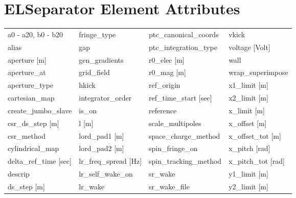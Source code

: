  \section{ELSeparator Element Attributes}
 \label{s:list.elseparator}
 
 \begin{tabular}{llll} \toprule
a0 - a20, b0 - b20               & fringe_type                      & ptc_canonical_coords             & vkick                            \\
alias                            & gap                              & ptc_integration_type             & voltage [Volt]                   \\
aperture [m]                     & gen_gradients                    & r0_elec [m]                      & wall                             \\
aperture_at                      & grid_field                       & r0_mag [m]                       & wrap_superimpose                 \\
aperture_type                    & hkick                            & ref_origin                       & x1_limit [m]                     \\
cartesian_map                    & integrator_order                 & ref_time_start [sec]             & x2_limit [m]                     \\
create_jumbo_slave               & is_on                            & reference                        & x_limit [m]                      \\
csr_ds_step [m]                  & l [m]                            & scale_multipoles                 & x_offset [m]                     \\
csr_method                       & lord_pad1 [m]                    & space_charge_method              & x_offset_tot [m]                 \\
cylindrical_map                  & lord_pad2 [m]                    & spin_fringe_on                   & x_pitch [rad]                    \\
delta_ref_time [sec]             & lr_freq_spread [Hz]              & spin_tracking_method             & x_pitch_tot [rad]                \\
descrip                          & lr_self_wake_on                  & sr_wake                          & y1_limit [m]                     \\
ds_step [m]                      & lr_wake                          & sr_wake_file                     & y2_limit [m]                     \\

\end{tabular}
